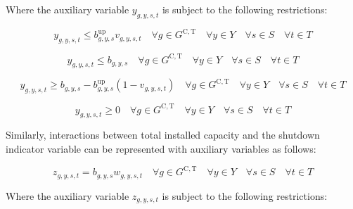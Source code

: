 \documentclass{article}
\newcommand{\sGeneratorsCandidateThermal}{G^{\mathrm{C,T}}}
\newcommand{\sYears}{Y}
\newcommand{\sScenarios}{S}
\newcommand{\sIntervals}{T}
\newcommand{\iGenerator}{g}
\newcommand{\iYear}{y}
\newcommand{\iScenario}{s}
\newcommand{\iInterval}{t}
\newcommand{\vStartupIndicator}[1][\iGenerator,\iYear,\iScenario,\iInterval]{v_{#1}}
\newcommand{\vShutdownIndicator}[1][\iGenerator,\iYear,\iScenario,\iInterval]{w_{#1}}
\newcommand{\vInstalledCapacityTotalScenario}[1][\iGenerator,\iYear,\iScenario]{b_{#1}}
\newcommand{\vInstalledCapacityStartupStateAux}[1][\iGenerator,\iYear,\iScenario,\iInterval]{y_{#1}}
\newcommand{\vInstalledCapacityShutdownStateAux}[1][\iGenerator,\iYear,\iScenario,\iInterval]{z_{#1}}
\begin{document}
Where the auxiliary variable $\vInstalledCapacityStartupStateAux$ is subject to the following restrictions:

\begin{equation}
	\vInstalledCapacityStartupStateAux \leq \vInstalledCapacityTotalScenario^{\mathrm{up}} \vStartupIndicator \quad \forall \iGenerator \in \sGeneratorsCandidateThermal \quad \forall \iYear \in \sYears \quad \forall \iScenario \in \sScenarios \quad \forall \iInterval \in \sIntervals
	\label{eqn: startup state aux variable block start}
\end{equation}

\begin{equation}
	\vInstalledCapacityStartupStateAux \leq \vInstalledCapacityTotalScenario \quad \forall \iGenerator \in \sGeneratorsCandidateThermal \quad \forall \iYear \in \sYears \quad \forall \iScenario \in \sScenarios \quad \forall \iInterval \in \sIntervals
\end{equation}

\begin{equation}
	\vInstalledCapacityStartupStateAux \geq \vInstalledCapacityTotalScenario - \vInstalledCapacityTotalScenario^{\mathrm{up}} \left(1 - \vStartupIndicator \right) \quad \forall \iGenerator \in \sGeneratorsCandidateThermal \quad \forall \iYear \in \sYears \quad \forall \iScenario \in \sScenarios \quad \forall \iInterval \in \sIntervals
\end{equation}

\begin{equation}
	\vInstalledCapacityStartupStateAux \geq 0 \quad \forall \iGenerator \in \sGeneratorsCandidateThermal \quad \forall \iYear \in \sYears \quad \forall \iScenario \in \sScenarios \quad \forall \iInterval \in \sIntervals
	\label{eqn: startup state aux variable block end}
\end{equation}

Similarly, interactions between total installed capacity and the shutdown indicator variable can be represented with auxiliary variables as follows:

\begin{equation}
\vInstalledCapacityShutdownStateAux = \vInstalledCapacityTotalScenario \vShutdownIndicator \quad \forall \iGenerator \in \sGeneratorsCandidateThermal \quad \forall \iYear \in \sYears \quad \forall \iScenario \in \sScenarios \quad \forall \iInterval \in \sIntervals
\end{equation}

Where the auxiliary variable $\vInstalledCapacityShutdownStateAux$ is subject to the following restrictions:
\end{document}
